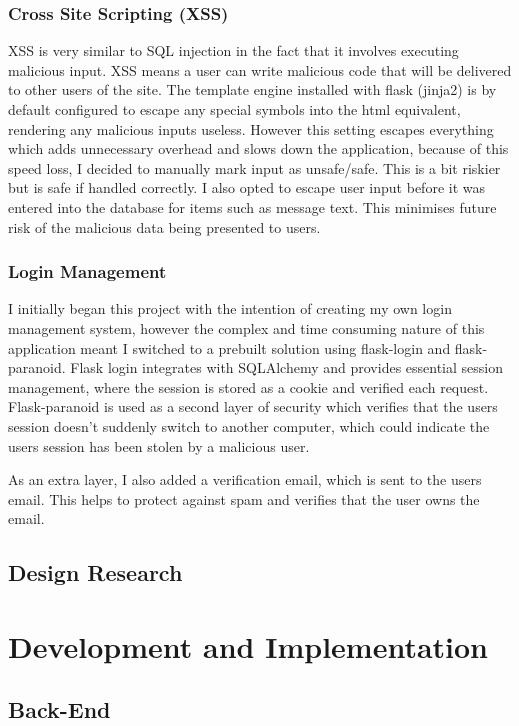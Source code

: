 \documentclass[a4paper,oneside,12pt,draft]{report}
\begin{document}
	\subsection{Cross Site Scripting (XSS)}
	XSS is very similar to SQL injection in the fact that it involves executing malicious input. XSS means a user can write malicious code that will be delivered to other users of the site. The template engine installed with flask (jinja2) is by default configured to escape any special symbols into the html equivalent, rendering any malicious inputs useless. However this setting escapes everything which adds unnecessary overhead and slows down the application, because of this speed loss, I decided to manually mark input as unsafe/safe. This is a bit riskier but is safe if handled correctly. I also opted to escape user input before it was entered into the database for items such as message text. This minimises future risk of the malicious data being presented to users.

	\subsection{Login Management}
	I initially began this project with the intention of creating my own login management system, however the complex and time consuming nature of this application meant I switched to a prebuilt solution using flask-login and flask-paranoid. Flask login integrates with SQLAlchemy and provides essential session management, where the session is stored as a cookie and verified each request. Flask-paranoid is used as a second layer of security which verifies that the users session doesn't suddenly switch to another computer, which could indicate the users session has been stolen by a malicious user.

	As an extra layer, I also added a verification email, which is sent to the users email. This helps to protect against spam and verifies that the user owns the email.

	\section{Design Research}

	\chapter{Development and Implementation}

	\section{Back-End}
\end{document}
